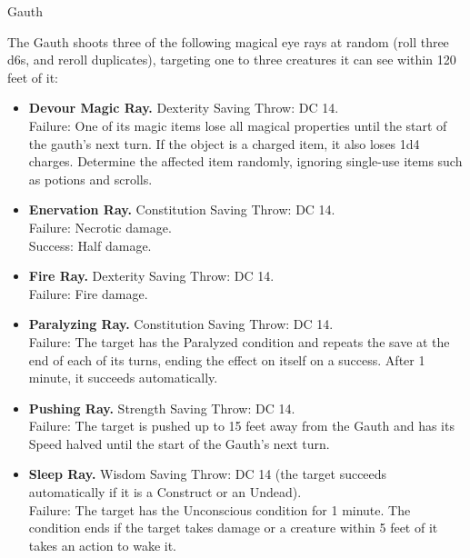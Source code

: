 \begin{DndMonster}[width=0.5\textwidth]{Gauth\label{monster:Gauth}}
	The Gauth shoots three of the following magical eye rays at random (roll three d6s, and reroll duplicates), targeting one to three creatures it can see within 120 feet of it:
	\begin{itemize}
		\item[\textbf{1:}] \textbf{Devour Magic Ray.} Dexterity Saving Throw: DC 14.\\
		Failure: One of its magic items lose all magical properties until the start of the gauth's next turn. If the object is a charged item, it also loses 1d4 charges. Determine the affected item randomly, ignoring single-use items such as potions and scrolls.
		\item[\textbf{2:}] \textbf{Enervation Ray.} Constitution Saving Throw: DC 14.\\
		Failure:  Necrotic damage.\\
		Success: Half damage.
		\item[\textbf{3:}] \textbf{Fire Ray.} Dexterity Saving Throw: DC 14.\\
		Failure:  Fire damage.
		\item[\textbf{4:}] \textbf{Paralyzing Ray.} Constitution Saving Throw: DC 14.\\
		Failure: The target has the Paralyzed condition and repeats the save at the end of each of its turns, ending the effect on itself on a success. After 1 minute, it succeeds automatically.
		\item[\textbf{5:}] \textbf{Pushing Ray.} Strength Saving Throw: DC 14.\\
		Failure: The target is pushed up to 15 feet away from the Gauth and has its Speed halved until the start of the Gauth's next turn.
		\item[\textbf{6:}] \textbf{Sleep Ray.} Wisdom Saving Throw: DC 14 (the target succeeds automatically if it is a Construct or an Undead).\\
		Failure: The target has the Unconscious condition for 1 minute. The condition ends if the target takes damage or a creature within 5 feet of it takes an action to wake it.
	\end{itemize}
\end{DndMonster}